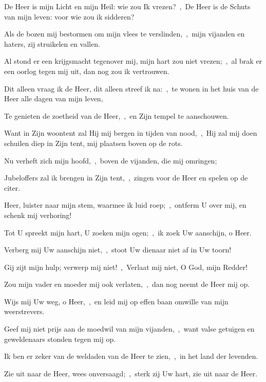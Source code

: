 \documentclass[12pt,twoside,a5paper]{article}
\begin{document}


\begin{halfparskip}
  De Heer is mijn Licht en mijn Heil: wie zou Ik vrezen?~\sep\ De Heer is de Schuts van mijn leven: voor wie zou ik sidderen?


  Als de bozen mij bestormen om mijn vlees te verslinden,~\sep\ mijn vijanden en haters, zij struikelen en vallen.

  Al stond er een krijgsmacht tegenover mij, mijn hart zou niet vrezen;~\sep\ al brak er een oorlog tegen mij uit, dan nog zou ik vertrouwen.
\end{halfparskip}


\begin{halfparskip}
  Dit alleen vraag ik de Heer, dit alleen streef ik na:~\sep\ te wonen in het huis van de Heer alle dagen van mijn leven,

  Te genieten de zoetheid van de Heer,~\sep\ en Zijn tempel te aanschouwen.

  Want in Zijn woontent zal Hij mij bergen in tijden van nood,~\sep\ Hij zal mij doen schuilen diep in Zijn tent, mij plaatsen boven op de rots.

  Nu verheft zich mijn hoofd,~\sep\ boven de vijanden, die mij omringen;

  Jubeloffers zal ik brengen in Zijn tent,~\sep\ zingen voor de Heer en spelen op de citer.
\end{halfparskip}


\begin{halfparskip}
  Heer, luister naar mijn stem, waarmee ik luid roep;~\sep\ ontferm U over mij, en schenk mij verhoring!

  Tot U spreekt mijn hart, U zoeken mijn ogen;~\sep\ ik zoek Uw aanschijn, o Heer.

  Verberg mij Uw aanschijn niet,~\sep\ stoot Uw dienaar niet af in Uw toorn!

  Gij zijt mijn hulp; verwerp mij niet!~\sep\ Verlaat mij niet, O God, mijn Redder!

  Zou mijn vader en moeder mij ook verlaten,~\sep\ dan nog neemt de Heer mij op.

  Wijs mij Uw weg, o Heer,~\sep\ en leid mij op effen baan omwille van mijn weerstrevers.

  Geef mij niet prijs aan de moedwil van mijn vijanden,~\sep\ want valse getuigen en geweldenaars stonden tegen mij op.

  Ik ben er zeker van de weldaden van de Heer te zien,~\sep\ in het land der levenden.

  Zie uit naar de Heer, wees onversaagd;~\sep\ sterk zij Uw hart, zie uit naar de Heer.
\end{halfparskip}
\end{document}

